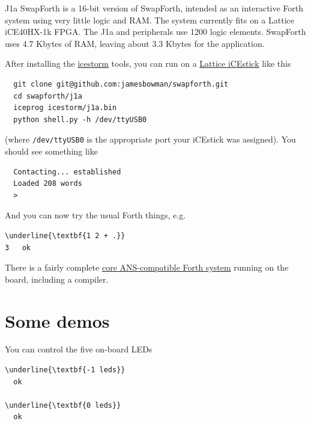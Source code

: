\documentclass[10pt]{book}
\newcommand{\mach}[1]{\texttt{#1}}
\begin{document}
J1a SwapForth is a 16-bit version of SwapForth,
intended as an interactive Forth system using very little logic and RAM.
The system currently fits on a Lattice iCE40HX-1k FPGA. 
The J1a and peripherals use 1200 logic elements.
SwapForth uses 4.7 Kbytes of RAM,
leaving about 3.3 Kbytes for the application. 

After installing the    
\href{http://www.clifford.at/icestorm/}{icestorm}
tools, you can run on a
\href{http://www.latticesemi.com/icestick}{Lattice iCEstick}
like this

\begin{framed}
\begin{Verbatim}
  git clone git@github.com:jamesbowman/swapforth.git
  cd swapforth/j1a
  iceprog icestorm/j1a.bin
  python shell.py -h /dev/ttyUSB0
\end{Verbatim}
\end{framed}

\noindent
(where \mach{/dev/ttyUSB0} is the appropriate port your iCEstick was assigned).
You should see something like

\begin{framed}
\begin{Verbatim}
  Contacting... established
  Loaded 208 words
  >
\end{Verbatim}
\end{framed}

And you can now try the usual Forth things, e.g.

\begin{framed}
\begin{Verbatim}[commandchars=\\\{\}]
\underline{\textbf{1 2 + .}}
3   ok
\end{Verbatim}
\end{framed}

There is a fairly complete 
\href{http://forth.sourceforge.net/std/dpans/dpans6.htm}{core ANS-compatible Forth system}
running on the board, including a compiler.

\section{Some demos} 

You can control the five on-board LEDs 

\begin{framed}
\begin{Verbatim}[commandchars=\\\{\}]
\underline{\textbf{-1 leds}}
  ok

\underline{\textbf{0 leds}}
  ok
\end{Verbatim}
\end{framed}
\end{document}
